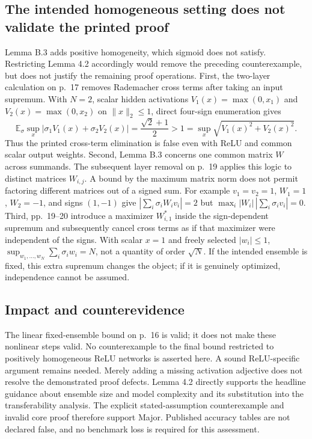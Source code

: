 \documentclass[10pt]{article}
\begin{document}
\subsection*{The intended homogeneous setting does not validate the printed proof}
Lemma B.3 adds positive homogeneity, which sigmoid does not satisfy. Restricting Lemma 4.2 accordingly would remove the preceding counterexample, but does not justify the remaining proof operations. First, the two-layer calculation on p. 17 removes Rademacher cross terms after taking an input supremum. With \(N=2\), scalar hidden activations \(V_1(x)=\max(0,x_1)\) and \(V_2(x)=\max(0,x_2)\) on \(\|x\|_2\le1\), direct four-sign enumeration gives \[\mathbb E_\sigma\sup_x|\sigma_1V_1(x)+\sigma_2V_2(x)|
 =\frac{\sqrt2+1}{2}>1
 =\sup_x\sqrt{V_1(x)^2+V_2(x)^2}.\] Thus the printed cross-term elimination is false even with ReLU and common scalar output weights. Second, Lemma B.3 concerns one common matrix \(W\) across summands. The subsequent layer removal on p. 19 applies this logic to distinct matrices \(W_{i,j}\). A bound by the maximum matrix norm does not permit factoring different matrices out of a signed sum. For example \(v_1=v_2=1\), \(W_1=1\), \(W_2=-1\), and signs \((1,-1)\) give \(|\sum_i\sigma_iW_iv_i|=2\) but \(\max_i|W_i|\,|\sum_i\sigma_iv_i|=0\). Third, pp. 19–20 introduce a maximizer \(W^*_{i,1}\) inside the sign-dependent supremum and subsequently cancel cross terms as if that maximizer were independent of the signs. With scalar \(x=1\) and freely selected \(|w_i|\le1\), \(\sup_{w_1,\ldots,w_N}\sum_i\sigma_iw_i=N\), not a quantity of order \(\sqrt N\). If the intended ensemble is fixed, this extra supremum changes the object; if it is genuinely optimized, independence cannot be assumed.\par
\subsection*{Impact and counterevidence}
The linear fixed-ensemble bound on p. 16 is valid; it does not make these nonlinear steps valid. No counterexample to the final bound restricted to positively homogeneous ReLU networks is asserted here. A sound ReLU-specific argument remains needed. Merely adding a missing activation adjective does not resolve the demonstrated proof defects. Lemma 4.2 directly supports the headline guidance about ensemble size and model complexity and its substitution into the transferability analysis. The explicit stated-assumption counterexample and invalid core proof therefore support Major. Published accuracy tables are not declared false, and no benchmark loss is required for this assessment.\par
\end{document}
